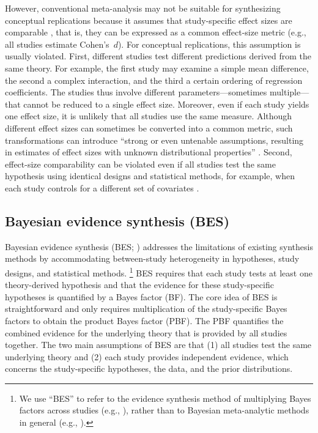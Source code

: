 \documentclass[letterpaper,11pt,oneside]{article}
\begin{document}
However, conventional meta-analysis may not be suitable for synthesizing conceptual replications because it assumes that study-specific effect sizes are comparable \parencite{borensteinBasicIntroductionFixedeffect2010}, that is, they can be expressed as a common effect-size metric (e.g., all studies estimate Cohen's~$d$). For conceptual replications, this assumption is usually violated. First, different studies test different predictions derived from the same theory. For example, the first study may examine a simple mean difference, the second a complex interaction, and the third a certain ordering of regression coefficients. The studies thus involve different parameters---sometimes multiple---that cannot be reduced to a single effect size. Moreover, even if each study yields one effect size, it is unlikely that all studies use the same measure. Although different effect sizes can sometimes be converted into a common metric, such transformations can introduce ``strong or even untenable assumptions, resulting in estimates of effect sizes with unknown distributional properties'' \parencite[p.~1]{vanassenEndJustifiesAll2023}. Second, effect-size comparability can be violated even if all studies test the same hypothesis using identical designs and statistical methods, for example, when each study controls for a different set of covariates \parencite{vanlissaTutorialAggregatingEvidence2024}.


\subsection{Bayesian evidence synthesis (BES)}

Bayesian evidence synthesis (BES; \cite{kuiperCombiningStatisticalEvidence2013}) addresses the limitations of existing synthesis methods by accommodating between-study heterogeneity in hypotheses, study designs, and statistical methods.%
    \footnote{We use ``BES'' to refer to the evidence synthesis method of multiplying Bayes factors across studies (e.g., \cite{kevenaarBayesianEvidenceSynthesis2021, klugkistBayesianEvidenceSynthesis2025}), rather than to Bayesian meta-analytic methods in general (e.g., \cite{scheibehenneBayesianEvidenceSynthesis2016, mulderBayesFactorHypothesis2026}).}
BES requires that each study tests at least one theory-derived hypothesis and that the evidence for these study-specific hypotheses is quantified by a Bayes factor (BF). The core idea of BES is straightforward and only requires multiplication of the study-specific Bayes factors to obtain the product Bayes factor (PBF). The PBF quantifies the combined evidence for the underlying theory that is provided by all studies together. The two main assumptions of BES are that (1) all studies test the same underlying theory and (2) each study provides independent evidence, which concerns the study-specific hypotheses, the data, and the prior distributions.
\end{document}
